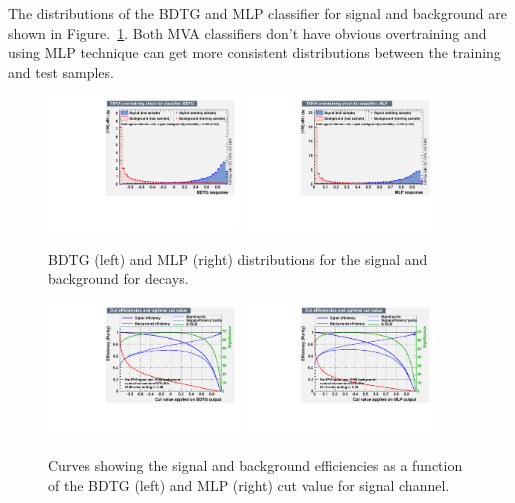 The distributions of the BDTG and MLP classifier for signal and background are shown in Figure.~\ref{fig:overtrain_BDTG}. 
Both MVA classifiers don't have obvious overtraining and using MLP technique can get more consistent distributions between the training and test samples.  

\begin{figure}[!bth]
\centering
\includegraphics[width=0.45\textwidth]{Figures/05_open_charm/02_selection/overtrain_BDTG.pdf}%
\includegraphics[width=0.45\textwidth]{Figures/05_open_charm/02_selection/overtrain_MLP.pdf}%
\caption{BDTG (left) and MLP (right) distributions for the signal and background for \LbLckkpi decays.}
\label{fig:overtrain_BDTG}
\end{figure}

\begin{figure}[!bth]
\centering
\includegraphics[width=0.45\textwidth]{Figures/05_open_charm/02_selection/mvaeffs_BDTG.pdf}%
\includegraphics[width=0.45\textwidth]{Figures/05_open_charm/02_selection/mvaeffs_MLP.pdf}%
\caption{Curves showing the signal and background efficiencies as a function of the BDTG (left) and MLP (right) cut value for signal channel.}
\label{fig:BDTG_optimize}
\end{figure}

